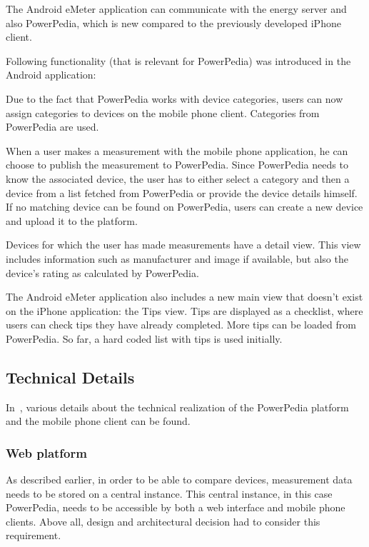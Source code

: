 The Android eMeter application can communicate with the energy server and also PowerPedia, which is new compared to the previously developed iPhone client. 

Following functionality (that is relevant for PowerPedia) was introduced in the Android application:

Due to the fact that PowerPedia works with device categories, users can now assign categories to devices on the mobile phone client. Categories from PowerPedia are used.

When a user makes a measurement with the mobile phone application, he can choose to publish the measurement to PowerPedia. Since PowerPedia needs to know the associated device, the user has to either select a category and then a device from a list fetched from PowerPedia or provide the device details himself. 
If no matching device can be found on PowerPedia, users can create a new device and upload it to the platform.  
 
Devices for which the user has made measurements have a detail view. This view includes information such as manufacturer and image if available, but also the device's rating as calculated by PowerPedia.  

The Android eMeter application also includes a new main view that doesn't exist on the iPhone application: the Tips view. Tips are displayed as a checklist, where users can check tips they have already completed. More tips can be loaded from PowerPedia. So far, a hard coded list with tips is used initially. 

\subsection{Technical Details}
In~\cite{merklepp}, various details about the technical realization of the PowerPedia platform and the mobile phone client can be found.

\subsubsection{Web platform}
As described earlier, in order to be able to compare devices, measurement data needs to be stored on a central instance. This central instance, in this case PowerPedia, needs to be accessible by both a web interface and mobile phone clients. Above all, design and architectural decision had to consider this requirement.

